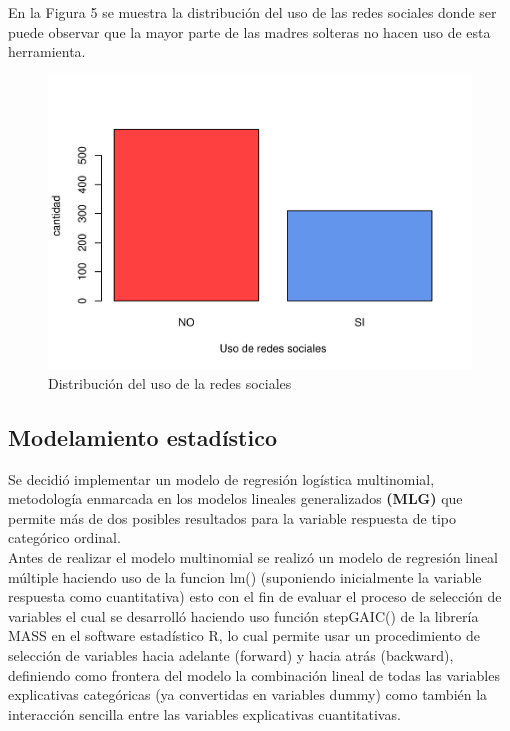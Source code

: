 \documentclass[11pt,twoside]{article}
\begin{document}
\vspace{140px}
\noindent
En la Figura 5 se muestra la distribución del uso de las redes sociales donde ser puede observar que la mayor parte de las madres solteras no hacen uso de esta herramienta.
\begin{figure}[H]
	\centering
	\includegraphics{usoderedes.pdf}
	\caption{Distribución del uso de la redes sociales}
\end{figure}



\subsection{Modelamiento estadístico}
\noindent

Se decidió implementar un modelo de regresión logística multinomial, metodología enmarcada en los modelos lineales generalizados\textbf{ (MLG)} que permite más de dos posibles resultados para la variable respuesta de tipo categórico ordinal. 
\\
Antes de realizar el modelo multinomial se realizó un modelo de regresión lineal múltiple haciendo uso de la funcion lm() (suponiendo inicialmente la variable respuesta como cuantitativa) esto con el fin de evaluar el proceso de selección de variables el cual se desarrolló haciendo uso función stepGAIC() de la librería MASS en el software estadístico R, lo cual permite usar un procedimiento de selección de variables hacia adelante (forward) y hacia atrás (backward), definiendo como frontera del modelo la combinación lineal de todas las variables explicativas categóricas (ya convertidas en variables dummy) como también la interacción sencilla entre las variables explicativas cuantitativas.
\end{document}
